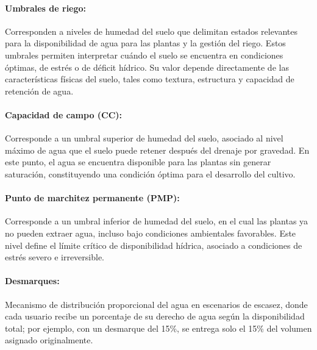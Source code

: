 \documentclass[12pt]{report}
\begin{document}
\vspace{0.2cm}

\paragraph{Umbrales de riego:} 
Corresponden a niveles de humedad del suelo que delimitan estados relevantes para la disponibilidad de agua para las plantas y la gestión del riego. Estos umbrales permiten interpretar cuándo el suelo se encuentra en condiciones óptimas, de estrés o de déficit hídrico. Su valor depende directamente de las características físicas del suelo, tales como textura, estructura y capacidad de retención de agua.

\vspace{0.2cm}

\paragraph{Capacidad de campo (CC):} 
Corresponde a un umbral superior de humedad del suelo, asociado al nivel máximo de agua que el suelo puede retener después del drenaje por gravedad. En este punto, el agua se encuentra disponible para las plantas sin generar saturación, constituyendo una condición óptima para el desarrollo del cultivo.

\vspace{0.2cm}

\paragraph{Punto de marchitez permanente (PMP):} 
Corresponde a un umbral inferior de humedad del suelo, en el cual las plantas ya no pueden extraer agua, incluso bajo condiciones ambientales favorables. Este nivel define el límite crítico de disponibilidad hídrica, asociado a condiciones de estrés severo e irreversible.


\vspace{0.2cm}

\paragraph{Desmarques:} 
Mecanismo de distribución proporcional del agua en escenarios de escasez, donde cada usuario recibe un porcentaje de su derecho de agua según la disponibilidad total; por ejemplo, con un desmarque del 15\%, se entrega solo el 15\% del volumen asignado originalmente.

\vspace{0.2cm}
\end{document}
